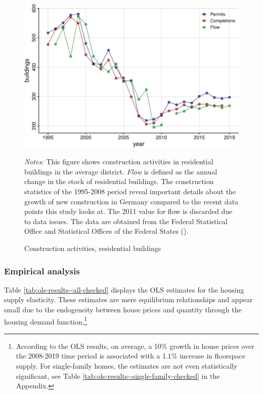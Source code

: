 \documentclass[
  12pt,
]{article}
\begin{document}
\begin{figure}[H]
\centering

\begin{center}\includegraphics{output/figs/construction-activities-1} \end{center}

\caption{Construction activities, residential buildings}\label{fig:construction-activities}
\medskip
\begin{minipage}{0.9\textwidth}
\footnotesize
\textit{Notes:} This figure shows construction activities in residential buildings in the average district. \textit{Flow} is defined as the annual change in the stock of residential buildings. The construction statistics of the 1995-2008 period reveal important details about the growth of new construction in Germany compared to the recent data points this study looks at. The 2011 value for flow is discarded due to data issues. The data are obtained from the Federal Statistical Office and Statistical Offices of the Federal States ().
\end{minipage}
\end{figure}

\subsubsection{Empirical analysis}\label{empirical-analysis}

Table \ref{tab:ols-results--all-checked} displays the OLS estimates for the housing supply elasticity. These estimates are mere equilibrium relationships and appear small due to the endogeneity between house prices and quantity through the housing demand function.\footnote{According to the OLS results, on average, a 10\% growth in house prices over the 2008-2019 time period is associated with a 1.1\% increase in floorspace supply. For single-family homes, the estimates are not even statistically significant, see Table \ref{tab:ols-results--single-family-checked} in the Appendix.}
\end{document}
